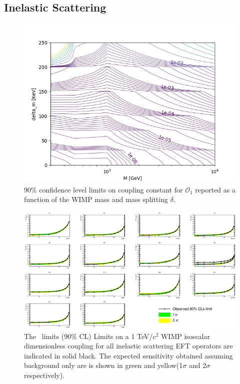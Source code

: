 \subsection{Inelastic Scattering}

\begin{figure}[h!]
\centerline{\includegraphics[width=1.\linewidth]{Figures/inelastic_delta_vs_m.png}}
\caption{90\% confidence level limits on coupling constant for $\mathcal{O}_1$ reported as a function of the WIMP mass and mass splitting $\delta$.}
\label{fig:2D_delta_vs_m}
\end{figure}  



\begin{figure}
\begin{minipage}{1.\linewidth}
\centerline{\includegraphics[width=1.\linewidth]{Figures/FinalInelastic.eps}}
\end{minipage}
\caption{The \Xehund\ limits (90\% CL) Limits on a 1 TeV/$c^2$ WIMP isoscalar dimensionless coupling for all inelastic scattering EFT operators are indicated in solid black. The expected sensitivity obtained assuming background only are is shown in green and yellow(1$\sigma$ and 2$\sigma$ respectively). }
\label{fig:elasticLimit}
\end{figure}

\FloatBarrier

